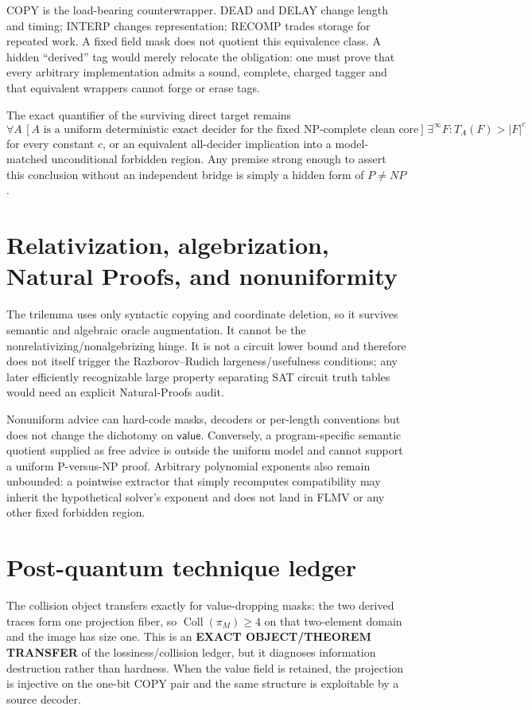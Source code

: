 \documentclass[11pt]{article}
\begin{document}
COPY is the load-bearing counterwrapper.  DEAD and DELAY change length and
timing; INTERP changes representation; RECOMP trades storage for repeated
work.  A fixed field mask does not quotient this equivalence class.  A hidden
``derived'' tag would merely relocate the obligation: one must prove that
every arbitrary implementation admits a sound, complete, charged tagger and
that equivalent wrappers cannot forge or erase tags.

The exact quantifier of the surviving direct target remains
\[
 \forall A\,[A\text{ is a uniform deterministic exact decider for the fixed
 NP-complete clean core}]\ \exists^\infty F:
 T_A(F)>|F|^c
\]
for every constant \(c\), or an equivalent all-decider implication into a
model-matched unconditional forbidden region.  Any premise strong enough to
assert this conclusion without an independent bridge is simply a hidden form
of \(P\ne NP\).

\section{Relativization, algebrization, Natural Proofs, and nonuniformity}

The trilemma uses only syntactic copying and coordinate deletion, so it
survives semantic and algebraic oracle augmentation.  It cannot be the
nonrelativizing/nonalgebrizing hinge.  It is not a circuit lower bound and
therefore does not itself trigger the Razborov--Rudich largeness/usefulness
conditions; any later efficiently recognizable large property separating
SAT circuit truth tables would need an explicit Natural-Proofs audit.

Nonuniform advice can hard-code masks, decoders or per-length conventions but
does not change the dichotomy on \(\mathsf{value}\).  Conversely, a
program-specific semantic quotient supplied as free advice is outside the
uniform model and cannot support a uniform P-versus-NP proof.  Arbitrary
polynomial exponents also remain unbounded: a pointwise extractor that simply
recomputes compatibility may inherit the hypothetical solver's exponent and
does not land in FLMV or any other fixed forbidden region.

\section{Post-quantum technique ledger}

The collision object transfers exactly for value-dropping masks: the two
derived traces form one projection fiber, so
\(
\operatorname{Coll}(\pi_M)\ge4
\)
on that two-element domain and the image has size one.  This is an
\textbf{EXACT OBJECT/THEOREM TRANSFER} of the lossiness/collision ledger, but
it diagnoses information destruction rather than hardness.  When the value
field is retained, the projection is injective on the one-bit COPY pair and
the same structure is exploitable by a source decoder.
\end{document}
